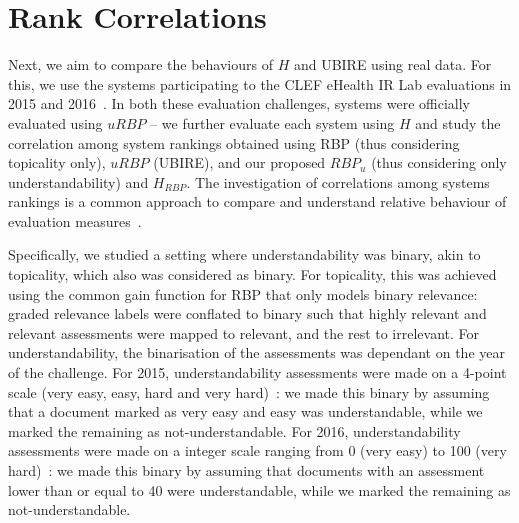 



\section{Rank Correlations} %
\label{sec:clef}
Next, we aim to compare the behaviours of $H$ and UBIRE using real data. For this, we use the systems participating to the CLEF eHealth IR Lab evaluations in 2015 and 2016~\cite{clefIR15,clefIR16}. In both these evaluation challenges, systems were officially evaluated using $uRBP$ -- we further evaluate each system using $H$ and study the correlation among system rankings obtained using RBP (thus considering topicality only), $uRBP$ (UBIRE), and our proposed $RBP_u$ (thus considering only understandability) and $H_{RBP}$. The investigation of correlations among systems rankings is a common approach to compare and understand relative behaviour of evaluation measures~\cite{}. 

Specifically, we studied a setting where understandability was binary, akin to topicality, which also was considered as binary. For topicality, this was achieved using the common gain function for RBP that only models binary relevance: graded relevance labels were conflated to binary such that highly relevant and relevant assessments were mapped to relevant, and the rest to irrelevant. For understandability, the binarisation of the assessments was dependant on the year of the challenge. For 2015, understandability assessments were made on a 4-point scale (very easy, easy, hard and very hard)~\cite{clefIR15}: we made this binary by assuming that a document marked as very easy and easy was understandable, while we marked the remaining as not-understandable. For 2016, understandability assessments were made on a integer scale ranging from 0 (very easy) to 100 (very hard)~\cite{clefIR16}: we made this binary by assuming that documents with an assessment lower than or equal to 40 were understandable, while we marked the remaining as not-understandable. 



